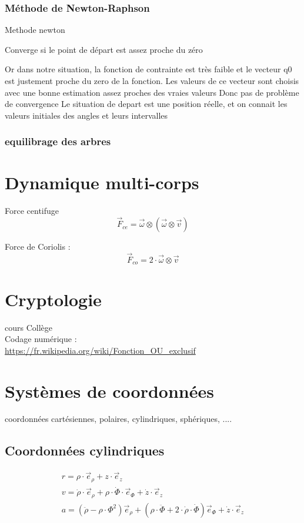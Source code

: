 \subsubsection{Méthode de Newton-Raphson}
Methode newton

Converge si le point de départ est assez proche du zéro

Or dans notre situation, la fonction de contrainte est très faible et le vecteur q0 est justement proche du zero de la fonction. Les valeurs de ce vecteur sont choisis avec une bonne estimation assez proches des vraies valeurs
Donc pas de problème de convergence
Le situation de depart est une position réelle, et on connait les valeurs initiales des angles et leurs intervalles


\subsubsection{equilibrage des arbres}

\section{Dynamique multi-corps}
Force centifuge
\begin{equation}
\vec{F}_{ce}=\vec{\omega}\otimes(\vec{\omega}\otimes \vec{v})
\end{equation}

Force de Coriolis : 
\begin{equation}
\vec{F}_{co}=2 \cdot \vec{\omega}\otimes \vec{v}
\end{equation}
\newpage

\newpage
\section{Cryptologie}
cours Collège\\
Codage numérique :\\
\url{https://fr.wikipedia.org/wiki/Fonction_OU_exclusif}\\

\newpage
\section{Systèmes de coordonnées}
coordonnées cartésiennes, polaires, cylindriques, sphériques, ....\\
\subsection{Coordonnées cylindriques}
\begin{eqnarray}
r=\rho \cdot \vec{e}_{\rho}+z \cdot \vec{e}_z\\
v=\dot{\rho} \cdot \vec{e}_{\rho} + \rho \cdot \dot{\Phi}\cdot \vec{e}_{\Phi}+\dot{z}\cdot \vec{e}_z\\
a=(\ddot{\rho}-\rho \cdot \Phi^2)\vec{e}_{\rho}+(\rho \cdot \ddot{\Phi}+2 \cdot \dot{\rho}\cdot \dot{\Phi})\vec{e}_{\Phi}+\dot{z}\cdot \vec{e}_z
\end{eqnarray}

